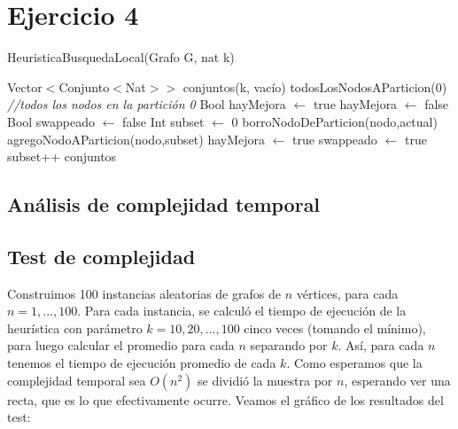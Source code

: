 \section{Ejercicio 4}

\begin{algorithm}[H]
\begin{algorithmic}[1]
\caption{HeuristicaBusquedaLocal(Grafo G, nat k)}
\STATE Vector$<$Conjunto$<$Nat$>>$ conjuntos(k, vacío)
\STATE todosLosNodosAParticion(0) \textit{//todos los nodos en la partición 0}
\STATE Bool hayMejora $\leftarrow$ true
    \STATE hayMejora $\leftarrow$ false
        \STATE Bool swappeado $\leftarrow$ false
        \STATE Int subset $\leftarrow$ 0
                \STATE borroNodoDeParticion(nodo,actual)
                \STATE agregoNodoAParticion(nodo,subset)
                \STATE hayMejora $\leftarrow$ true
                \STATE swappeado $\leftarrow$ true
            \ENDIF
            \STATE subset++
        \ENDWHILE
    \ENDFOR
\ENDWHILE
\RETURN conjuntos
\end{algorithmic}
\end{algorithm}

\subsection{Análisis de complejidad temporal}

\subsection{Test de complejidad}

Construimos 100 instancias aleatorias de grafos de $n$ vértices, para cada $n = {1, ... , 100}$. Para cada instancia, se calculó el tiempo de ejecución de la heurística con parámetro $k = {10, 20, ..., 100}$ cinco veces (tomando el mínimo), para luego calcular el promedio para cada $n$ separando por $k$. Así, para cada $n$ tenemos el tiempo de ejecución promedio de cada $k$. Como esperamos que la complejidad temporal sea $O(n^2)$ se dividió la muestra por $n$, esperando ver una recta, que es lo que efectivamente ocurre. Veamos el gráfico de los resultados del test:

%

